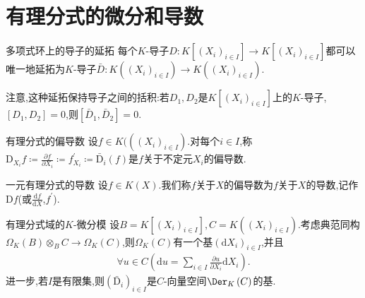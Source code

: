 \section{有理分式的微分和导数}

\begin{proposition}{多项式环上的导子的延拓}{}
	每个$K$-导子$D:K[(X_{i})_{i\in I}]\to K[(X_{i})_{i\in I}]$都可以唯一地延拓为$K$-导子$\bar{D}:K((X_{i})_{i\in I})\to K((X_{i})_{i\in I})$.
\end{proposition}

\begin{remark}{}{}
	注意,这种延拓保持导子之间的括积:若$D_{1},D_{2}$是$K[(X_{i})_{i\in I}]$上的$K$-导子,$\left[D_{1},D_{2}\right]=0$,则$\left[\bar{D}_{1},\bar{D}_{2}\right]=0$.
\end{remark}

\begin{definition}{有理分式的偏导数}{}
	设$f\in K(((X_{i})_{i\in I})$.对每个$i\in I$,称$\mathrm{D}_{X_{i}}f\coloneq\frac{\partial f}{\partial X_{i}}\coloneq f_{X_{i}}^{\prime}\coloneq\bar{\mathrm{D}}_{i}\left(f\right)$是$f$关于不定元$X_{i}$的偏导数.
\end{definition}

\begin{definition}{一元有理分式的导数}{}
	设$f\in K\left(X\right)$.我们称$f$关于$X$的偏导数为$f$关于$X$的导数,记作$\mathrm{D}f$(或$\frac{\mathrm{d}f}{\mathrm{d}X}$,$f^{\prime}$).
\end{definition}

\begin{proposition}{有理分式域的$K$-微分模}{}
	设$B=K[(X_{i})_{i\in I}],C=K((X_{i})_{i\in I})$.考虑典范同构$\Omega_{K}\left(B\right)\otimes_{B}C\to\Omega_{K}\left(C\right)$,则$\Omega_{K}\left(C\right)$有一个基$\left(\mathrm{d}X_{i}\right)_{i\in I}$,并且
	\begin{align*}
		\forall u\in C\left(\mathrm{d}u=\sum\limits_{i\in I}\frac{\partial u}{\partial X_{i}}\mathrm{d}X_{i}\right).
	\end{align*}
	进一步,若$I$是有限集,则$\left(\bar{\mathrm{D}}_{i}\right)_{i\in I}$是$C$-向量空间$\Der_{K}\left(C\right)$的基.
\end{proposition}

